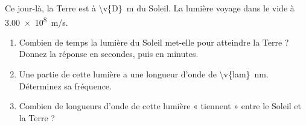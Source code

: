 Ce jour-là, la Terre est à \qty[exponent-mode=scientific,round-mode=figures,round-precision=3]{\v{D}}{m} du Soleil. La lumière voyage dans le vide à \qty{3.00e8}{m/s}.

\begin{enumerate}[label=\alph*)]
    \item Combien de temps la lumière du Soleil met-elle pour atteindre la Terre ? Donnez la réponse en secondes, puis en minutes.
    \item Une partie de cette lumière a une longueur d'onde de \qty{\v{lam}}{nm}. Déterminez sa fréquence.
    \item Combien de longueurs d'onde de cette lumière « tiennent » entre le Soleil et la Terre ?
\end{enumerate}
